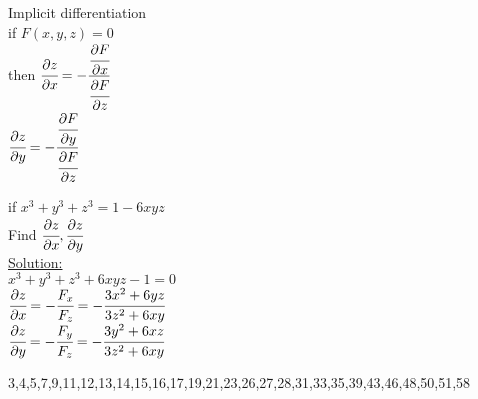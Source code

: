 \noindent{\color{smalt(darkpowderblue)}\rule{\linewidth}{.2mm}}
\begin{definition}
Implicit differentiation\\
if $F(x,y,z)=0$\\
then $\cfrac{\partial z}{\partial x}=-\cfrac{\cfrac{\partial F}{\partial x}}{\cfrac{\partial F}{\partial z}}$\\
$\cfrac{\partial z}{\partial y}=-\cfrac{\cfrac{\partial F}{\partial y}}{\cfrac{\partial F}{\partial z}}$
\end{definition}
\noindent{\color{smalt(darkpowderblue)}\rule{\linewidth}{.2mm}}
\begin{example}
if $x^3+y^3+z^3=1-6x y z$\\
Find $\cfrac{\partial z}{\partial x},\cfrac{\partial z}{\partial y}$\\
{\color{smalt(darkpowderblue)}\underline{Solution:}}\\
$x^3+y^3+z^3+6xyz-1=0$\\
$\cfrac{\partial z}{\partial x}=-\cfrac{F_x}{F_z}=-\cfrac{3x^2+6yz}{3z^2+6xy}$\\
$\cfrac{\partial z}{\partial y}=-\cfrac{F_y}{F_z}=-\cfrac{3y^2+6xz}{3z^2+6xy}$
\end{example}
\noindent{\color{smalt(darkpowderblue)}\rule{\linewidth}{.2mm}}
\begin{problem}
3,4,5,7,9,11,12,13,14,15,16,17,19,21,23,26,27,28,31,33,35,39,43,46,48,50,51,58
\end{problem}